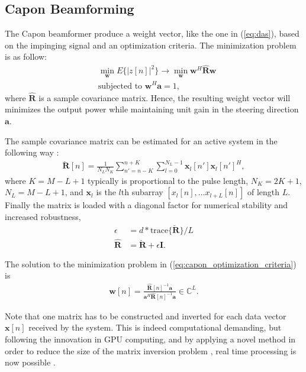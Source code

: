 \documentclass[journal]{IEEEtran}
\newcommand{\mat}[1]{\mathbf{#1}}
\renewcommand{\vec}[1]{\mathbf{#1}}
\begin{document}
\subsection{Capon Beamforming}
The Capon beamformer produce a weight vector, like the one in (\ref{eq:das}), based on the impinging signal and an optimization criteria. The minimization problem is as follow:
\begin{align}
&\min_{\vec{w}} E\{|z[n]|^2\} \rightarrow \min_{\vec{w}} \vec{w}^H \mat{\hat{R}} \vec{w} \label{eq:capon_optimization_criteria} \\
&\text{subjected to } \vec{w}^H\vec{a} = 1,
\end{align}
where $\mat{\hat{R}}$ is a sample covariance matrix. Hence, the resulting weight vector will minimizes the output power while maintaining unit gain in the steering direction $\vec{a}$. %

The sample covariance matrix can be estimated for an active system in the following way \cite{Synnevag2009}:
\begin{align}
\mat{\breve{R}}[n] = \frac{1}{N_LN_K}\sum_{n'=n-K}^{n+K} \sum_{l=0}^{N_L-1} \vec{x}_l[n']\vec{x}_l[n']^H,
\end{align}
where $K = M-L+1$ typically is proportional to the pulse length, $N_K = 2K + 1$, $N_L = M-L+1$, and $\vec{x}_l$ is the $l\text{th}$ subarray $[x_l[n], \dotso x_{l+L}[n]]$ of length $L$. Finally the matrix is loaded with a diagonal factor for numerical stability and increased robustness, 
\begin{align}
\epsilon &= d*\text{trace}\{\mat{\breve{R}}\}/L\\
\mat{\hat{R}} &= \mat{\breve{R}} + \epsilon\mat{I}.
\end{align} 

The solution to the minimization problem in (\ref{eq:capon_optimization_criteria}) is
\begin{align}\label{eq:capon_weights}
\vec{w}[n] = \frac{\mat{\hat{R}}[n]^{-1}\vec{a}}{\vec{a}^H\mat{\hat{R}}[n]^{-1}\vec{a}} \in \mathbb{C}^L.
\end{align}

Note that one matrix has to be constructed and inverted for each data vector $\vec{x}[n]$ received by the system. This is indeed computational demanding, but following the innovation in GPU computing, and by applying a novel method in order to reduce the size of the matrix inversion problem \cite{Nilsen2009}, real time processing is now possible \cite{Asen}.
\end{document}
